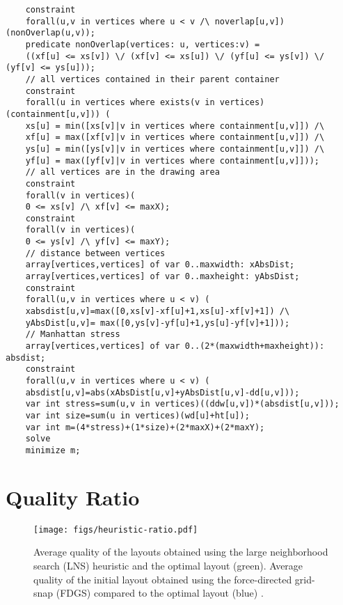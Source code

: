\documentclass[a4paper,11pt,phdthesis,singlespace,twoside]{cssethesis}
\begin{document}
\begin{lstlisting}
    constraint
    forall(u,v in vertices where u < v /\ noverlap[u,v])(nonOverlap(u,v));
    predicate nonOverlap(vertices: u, vertices:v) =
    ((xf[u] <= xs[v]) \/ (xf[v] <= xs[u]) \/ (yf[u] <= ys[v]) \/ (yf[v] <= ys[u]));
    // all vertices contained in their parent container
    constraint
    forall(u in vertices where exists(v in vertices)(containment[u,v])) (
    xs[u] = min([xs[v]|v in vertices where containment[u,v]]) /\
    xf[u] = max([xf[v]|v in vertices where containment[u,v]]) /\
    ys[u] = min([ys[v]|v in vertices where containment[u,v]]) /\
    yf[u] = max([yf[v]|v in vertices where containment[u,v]]));
    // all vertices are in the drawing area
    constraint
    forall(v in vertices)(
    0 <= xs[v] /\ xf[v] <= maxX);
    constraint
    forall(v in vertices)(
    0 <= ys[v] /\ yf[v] <= maxY);
    // distance between vertices
    array[vertices,vertices] of var 0..maxwidth: xAbsDist;
    array[vertices,vertices] of var 0..maxheight: yAbsDist;
    constraint
    forall(u,v in vertices where u < v) (
    xabsdist[u,v]=max([0,xs[v]-xf[u]+1,xs[u]-xf[v]+1]) /\
    yAbsDist[u,v]= max([0,ys[v]-yf[u]+1,ys[u]-yf[v]+1]));
    // Manhattan stress
    array[vertices,vertices] of var 0..(2*(maxwidth+maxheight)): absdist;
    constraint
    forall(u,v in vertices where u < v) (
    absdist[u,v]=abs(xAbsDist[u,v]+yAbsDist[u,v]-dd[u,v]));
    var int stress=sum(u,v in vertices)((ddw[u,v])*(absdist[u,v]));
    var int size=sum(u in vertices)(wd[u]+ht[u]);
    var int m=(4*stress)+(1*size)+(2*maxX)+(2*maxY);
    solve
    minimize m;
\end{lstlisting}

\chapter{Quality Ratio} \label{app:ratio}
\begin{figure}[hb]
\begin{center}
\texttt{[image: figs/heuristic-ratio.pdf]}
\end{center}
\caption{Average quality of the layouts obtained using the large neighborhood search (LNS) heuristic and the optimal layout (green). Average quality of the initial layout obtained using the force-directed grid-snap (FDGS) compared to the optimal layout (blue) \cite{Yoghourdjian2015high}.}
\label{fig:ratio}
\end{figure}
\end{document}
